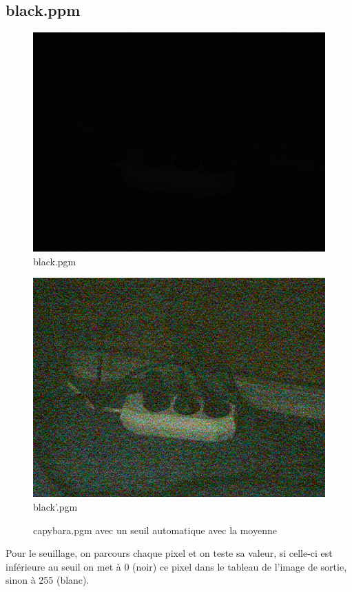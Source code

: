\documentclass{article}
\begin{document}
\subsection{black.ppm}
\begin{figure}[h]
\centerline{\includegraphics[scale=0.5]{./rendus/black.png}}
\caption{black.pgm }
\end{figure}

\begin{figure}[h]
\centerline{\includegraphics[scale=0.5]{./rendus/blackOut.png}}
\caption{black'.pgm }
\end{figure}

\begin{figure}[h]
\caption{capybara.pgm avec un seuil automatique avec la moyenne}
\end{figure}

Pour le seuillage, on parcours chaque pixel et on teste sa valeur, si celle-ci est inférieure au seuil on met à 0 (noir) ce pixel dans le tableau de l'image de sortie, sinon à 255 (blanc).
\end{document}
